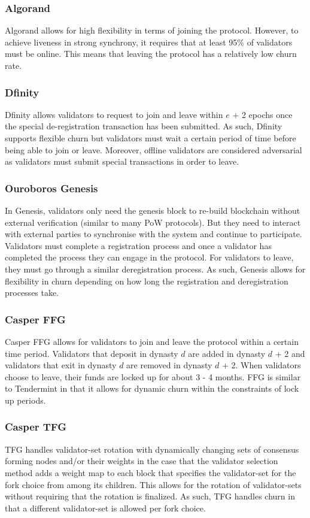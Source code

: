 \documentclass[10pt,journal,compsoc]{IEEEtran}
\begin{document}
\subsubsection{Algorand} Algorand allows for high flexibility in terms of joining the protocol.
However, to achieve liveness in strong synchrony, it requires that at least 95\% of validators must be online. This means that leaving the protocol has a relatively low churn rate.

\subsubsection{Dfinity} Dfinity allows validators to request to join and leave within $e$ + 2 epochs once the special de-registration transaction has been submitted. As such, Dfinity supports flexible churn but validators must wait a certain period of time before being able to join or leave. Moreover, offline validators are considered adversarial as validators must submit special transactions in order to leave. 

\subsubsection{Ouroboros Genesis} In Genesis, validators only need the genesis block to re-build blockchain without external verification (similar to many PoW protocols). But they need to interact with external parties to synchronise with the system and continue to participate. Validators must complete a registration process and once a validator has completed the process they can engage in the protocol. For validators to leave, they must go through a similar deregistration process. As such, Genesis allows for flexibility in churn depending on how long the registration and deregistration processes take. 

\subsubsection{Casper FFG} Casper FFG allows for validators to join and leave the protocol within a certain time period. Validators that deposit in dynasty $d$ are added in dynasty $d$ + 2 and validators that exit in dynasty $d$ are removed in dynasty $d$ + 2. When validators choose to leave, their funds are locked up for about 3 - 4 months. FFG is similar to Tendermint in that it allows for dynamic churn within the constraints of lock up periods. 

\subsubsection{Casper TFG} TFG handles validator-set rotation with dynamically changing sets of consensus forming nodes and/or their weights in the case that the validator selection method adds a weight map to each block that specifies the validator-set for the fork choice from among its children. This allows for the rotation of validator-sets without requiring that the rotation is finalized. As such, TFG handles churn in that a different validator-set is allowed per fork choice. 
\end{document}
